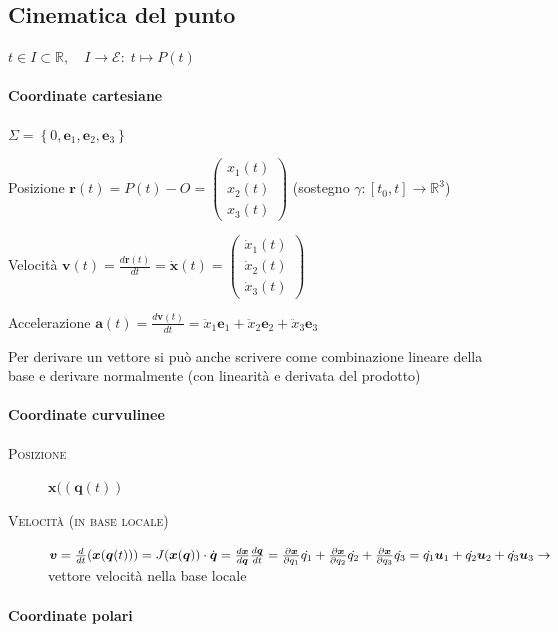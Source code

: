 \documentclass[a4paper,10pt]{article}
\theoremstyle{definition}
\newcommand{\bv}{\boldsymbol} %
\newcommand{\cvv}[3]{\begin{pmatrix} #1 \\ #2 \\ #3 \end{pmatrix}} %
\newcommand{\re}{\mathbb{R}} %
\newcommand{\mylist}[1]{\textnormal{\textsc{#1}}}
\theoremstyle{indentdefinition}
\theoremstyle{indenttheorem}
\theoremstyle{myremark}
\theoremstyle{indentgeneral}
\newenvironment{lyxlist}[1]
	{\begin{list}{}
		{\settowidth{\labelwidth}{#1}
		 \setlength{\leftmargin}{\labelwidth}
		 \addtolength{\leftmargin}{\labelsep}
		 \renewcommand{\makelabel}[1]{##1\hfil}}}
	{\end{list}}
\begin{document}
\subsection{Cinematica del punto}
$t\in I\subset \re,\quad I\to\mathscr{E}:\; t\mapsto P(t)$
\paragraph{Coordinate cartesiane}

$\Sigma=\left\{ 0,\boldsymbol{e}_{1},\boldsymbol{e}_{2},\boldsymbol{e}_{3}\right\} $
\begin{lyxlist}{00.00.0000}
\item [{{Posizione}}] $\boldsymbol{r}\left(t\right)=P\left(t\right)-O=\cvv{{x}_1(t)}{{x}_2(t)}{{x}_3(t)}$
(sostegno $\gamma\colon\left[t_{0},t\right]\rightarrow\mathbb{R}^3$)
\item [{{Velocità}}] $\boldsymbol{v}\left(t\right)=\frac{d\boldsymbol{r}\left(t\right)}{dt}=\dot{\bv{x}}(t)=\cvv{\dot{x}_1(t)}{\dot{x}_2(t)}{\dot{x}_3(t)}$
\item [{{Accelerazione}}] $\boldsymbol{a}\left(t\right)=\frac{d\boldsymbol{v}\left(t\right)}{dt}=\ddot{x}_{1}\boldsymbol{e}_{1}+\ddot{x}_{2}\boldsymbol{e}_{2}+\ddot{x}_{3}\boldsymbol{e}_{3}$
\end{lyxlist}
Per derivare un vettore si può anche scrivere come combinazione lineare della base e derivare normalmente  (con linearità e derivata del prodotto)

\paragraph{Coordinate curvulinee} 
\begin{description}
    \item[\textnormal{\textsc{Posizione}}] $\bv{x}((\bv{q}(t))$
    \item[\mylist{Velocità (in base locale)}]  $\bv{v}=\frac{d}{dt}(\bv{x}(\bv{q}(t))) = J(\bv{x}(\bv{q}))\cdot\dot{\bv{q}}= \frac{d\bv{x}}{d\bv{q}}\frac{d\bv{q}}{dt}=\pdv{\bv{x}}{q_1}\dot{q_1}+\pdv{\bv{x}}{q_2}\dot{q_2}+\pdv{\bv{x}}{q_3}\dot{q_3}=\dot{q_1}\bv{u}_1+\dot{q_2}\bv{u}_2+\dot{q_3}\bv{u}_3 \rightarrow$ vettore velocità nella base locale
\end{description}

\paragraph{Coordinate polari}
\end{document}
